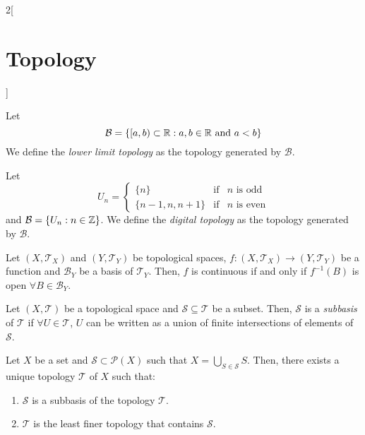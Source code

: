 \documentclass[../../../main.tex]{subfiles}
\begin{document}
\begin{multicols}{2}[\section{Topology}]
\begin{definition}
  \end{definition}
  \begin{definition}
    Let $$\mathcal{B}=\{[a,b)\subset\mathbb{R}:a,b\in\mathbb{R}\text{ and }a<b\}$$
    We define the \textit{lower limit topology} as the topology generated by $\mathcal{B}$.
  \end{definition}
  \begin{definition}
    Let
    $$U_n=\left\{
      \begin{array}{ccl}
        \{n\}         & \text{if} & \text{$n$ is odd}  \\
        \{n-1,n,n+1\} & \text{if} & \text{$n$ is even}
      \end{array}\right.$$
    and $\mathcal{B}=\{U_n:n\in\mathbb{Z}\}$. We define the \textit{digital topology} as the topology generated by $\mathcal{B}$.
  \end{definition}
  \begin{theorem}
    Let $(X,\mathcal{T}_X)$ and $(Y,\mathcal{T}_Y)$ be topological spaces, $f:(X,\mathcal{T}_X)\rightarrow (Y,\mathcal{T}_Y)$ be a function and $\mathcal{B}_Y$ be a basis of $\mathcal{T}_Y$. Then, $f$ is continuous if and only if $f^{-1}(B)$ is open $\forall B\in \mathcal{B}_Y$.
  \end{theorem}
  \begin{definition}
    Let $(X,\mathcal{T})$ be a topological space and $\mathcal{S}\subseteq\mathcal{T}$ be a subset. Then, $\mathcal{S}$ is a \textit{subbasis} of $\mathcal{T}$ if $\forall U\in\mathcal{T}$, $U$ can be written as a union of finite intersections of elements of $\mathcal{S}$.
  \end{definition}
  \begin{prop}
    Let $X$ be a set and $\mathcal{S}\subset\mathcal{P}(X)$ such that $X=\bigcup_{S\in\mathcal{S}} S$. Then, there exists a unique topology $\mathcal{T}$ of $X$ such that:
    \begin{enumerate}
      \item $\mathcal{S}$ is a subbasis of the topology $\mathcal{T}$.
      \item $\mathcal{T}$ is the least finer topology that contains $\mathcal{S}$.
    \end{enumerate}
  \end{prop}

\end{multicols}
\end{document}
